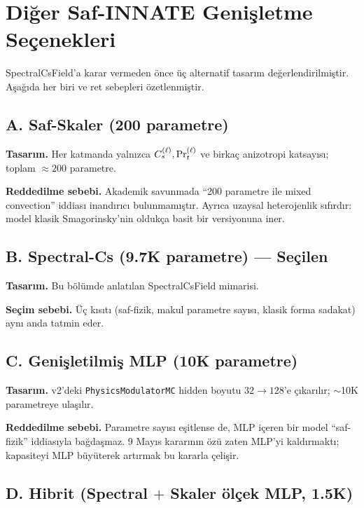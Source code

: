 \section{Diğer Saf-INNATE Genişletme Seçenekleri}
\label{sec:alternatives}

SpectralCsField'a karar vermeden önce üç alternatif tasarım
değerlendirilmiştir. Aşağıda her biri ve ret sebepleri özetlenmiştir.

\subsection{A. Saf-Skaler (200 parametre)}

\textbf{Tasarım.} Her katmanda yalnızca $C_s^{(\ell)}, \mathrm{Pr}_t^{(\ell)}$
ve birkaç anizotropi katsayısı; toplam $\approx 200$ parametre.

\textbf{Reddedilme sebebi.} Akademik savunmada ``200 parametre ile mixed
convection'' iddiası inandırıcı bulunmamıştır. Ayrıca uzaysal heterojenlik
sıfırdır: model klasik Smagorinsky'nin oldukça basit bir versiyonuna iner.

\subsection{B. Spectral-Cs (9.7K parametre) — \textbf{Seçilen}}

\textbf{Tasarım.} Bu bölümde anlatılan SpectralCsField mimarisi.

\textbf{Seçim sebebi.} Üç kısıtı (saf-fizik, makul parametre sayısı,
klasik forma sadakat) aynı anda tatmin eder.

\subsection{C. Genişletilmiş MLP (10K parametre)}

\textbf{Tasarım.} v2'deki \texttt{PhysicsModulatorMC} hidden boyutu
$32\to 128$'e çıkarılır; $\sim$10K parametreye ulaşılır.

\textbf{Reddedilme sebebi.} Parametre sayısı eşitlense de, MLP içeren
bir model ``saf-fizik'' iddiasıyla bağdaşmaz. 9 Mayıs kararının özü
zaten MLP'yi kaldırmaktı; kapasiteyi MLP büyüterek artırmak bu kararla
çelişir.

\subsection{D. Hibrit (Spectral $+$ Skaler ölçek MLP, 1.5K)}

